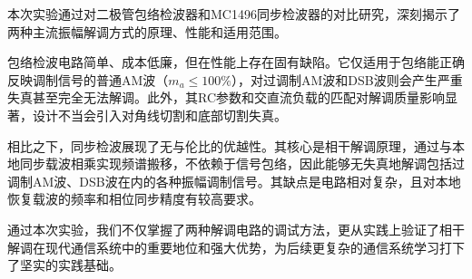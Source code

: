 \documentclass[12pt]{article}
\begin{document}
本次实验通过对二极管包络检波器和MC1496同步检波器的对比研究，深刻揭示了两种主流振幅解调方式的原理、性能和适用范围。

包络检波电路简单、成本低廉，但在性能上存在固有缺陷。它仅适用于包络能正确反映调制信号的普通AM波（$m_a \le 100\%$），对过调制AM波和DSB波则会产生严重失真甚至完全无法解调。此外，其RC参数和交直流负载的匹配对解调质量影响显著，设计不当会引入对角线切割和底部切割失真。

相比之下，同步检波展现了无与伦比的优越性。其核心是相干解调原理，通过与本地同步载波相乘实现频谱搬移，不依赖于信号包络，因此能够无失真地解调包括过调制AM波、DSB波在内的各种振幅调制信号。其缺点是电路相对复杂，且对本地恢复载波的频率和相位同步精度有较高要求。

通过本次实验，我们不仅掌握了两种解调电路的调试方法，更从实践上验证了相干解调在现代通信系统中的重要地位和强大优势，为后续更复杂的通信系统学习打下了坚实的实践基础。
\end{document}
